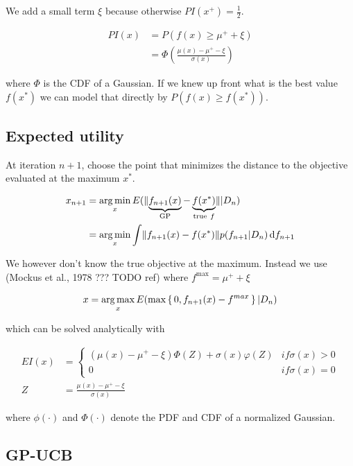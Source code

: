 We add a small term $\xi$ because otherwise $PI(x^+) = \frac{1}{2}.$

\begin{align}
    PI(x) &= P(f(x) \geq \mu^+ + \xi) \\
          &= \Phi \left(\frac{\mu(x) - \mu^+ - \xi}{\sigma(x)} \right)
\end{align}

where $\Phi$ is the CDF of a Gaussian. If we knew up front what is the best value $f(x^*)$ we can model that directly by $P(f(x) \geq f(x^*))$.


\subsection{Expected utility}

At iteration $n+1$, choose the point that minimizes the distance to the objective evaluated at the maximum $x^*$.

\begin{align}
    x_{n+1} &= \argmin_x E(\norm{ \underbrace{f_{n+1}(x)}_{\text{GP}} - \underbrace{f(x^*)}_{\text{true}\ f} } | D_n) \\
            &=\argmin_x \int \norm{f_{n+1}(x) - f(x^*)} p(f_{n+1} | D_n) \diff f_{n+1}
\end{align}

We however don't know the true objective at the maximum. Instead we use (Mockus et al., 1978 ??? TODO ref) where $f^{\max} = \mu^+ + \xi$

\begin{equation}
    x = \operatorname*{arg\,max}_x E(\max\set{0, f_{n+1}(x) - f^{max}}|D_n)
\end{equation}

which can be solved analytically with

\begin{align}
    EI(x) &= \begin{cases}
        (\mu(x) - \mu^+ - \xi) \Phi(Z) + \sigma(x)\varphi(Z) & if \sigma(x) > 0 \\
        0 & if \sigma(x) = 0
    \end{cases} \\
    Z &= \frac{\mu(x) - \mu^+ - \xi}{\sigma(x)}
\end{align}

where $\phi(\cdot)$ and $\Phi(\cdot)$ denote the PDF and CDF of a normalized Gaussian.


\subsection{GP-UCB}

